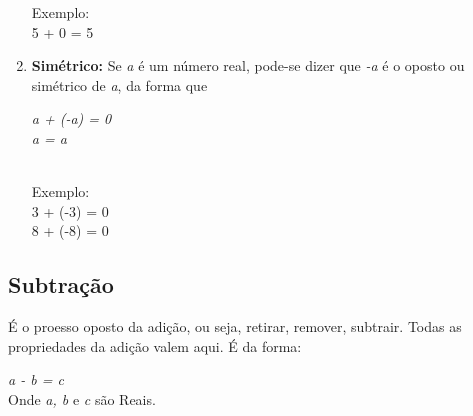\documentclass[a4paper, 12pt]{article}
\begin{document}
\begin{enumerate}
        Exemplo:\\
        5 + 0 = 5\\

    \item \textbf{Simétrico:} Se \textit{a} é um número real, pode-se dizer que \textit{-a} é o oposto ou simétrico de \textit{a}, da forma que\\
    
        \begin{sime} 
            \centering \textit{a + (-a) = 0}\\
            \centering \textit{a = a}\\
        \end{sime}\\
    
        Exemplo:\\
        3 + (-3) = 0\\
        8 + (-8) = 0 \\
\end{enumerate}
\subsection{Subtração} 
É o proesso oposto da adição, ou seja, retirar, remover, subtrair. Todas as propriedades da adição valem aqui. É da forma:\\

\begin{sub}
    \centering \textit{a - b = c}\\
    Onde \textit{a, b} e \textit{c} são Reais.
\end{sub}
\end{document}
